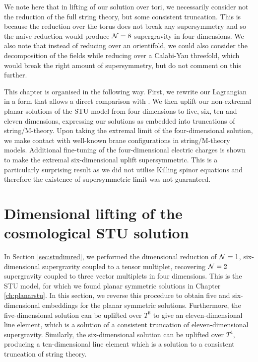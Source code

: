 We note here that in lifting of our solution over tori, we necessarily consider not the reduction of the full string theory, but some consistent truncation. This is because the reduction over the torus does not break any supersymmetry and so the naive reduction would produce ${\cal N} = 8$ supergravity in four dimensions. We also note that instead of reducing over an orientifold, we could also consider the decomposition of the fields while reducing over a Calabi-Yau threefold, which would break the right amount of supersymmetry, but do not comment on this further. 

This chapter is organised in the following way. First, we rewrite our Lagrangian  in a form that allows a direct comparison with \cite{Chow:2014cca}. We then uplift our non-extremal planar solutions of the STU model from four dimensions to five, six, ten and eleven dimensions, expressing our solutions as embedded into truncations of string/M-theory. Upon taking the extremal limit of the four-dimensional solution, we make contact with well-known brane configurations in string/M-theory models. Additional fine-tuning of the four-dimensional electric charges is shown to make the extremal six-dimensional uplift supersymmetric. This is a particularly surprising result as we did not utilise Killing spinor equations and therefore the existence of supersymmetric limit was not guaranteed.

\section{Dimensional lifting of the cosmological STU solution}
\label{sec:upliftstu}

In Section \ref{sec:studimred}, we performed the dimensional reduction of ${\cal N} = 1$, six-dimensional supergravity coupled to a tensor multiplet, recovering ${\cal N} = 2$ supergravity coupled to three vector multiplets in four dimensions. This is the STU model, for which we found planar symmetric solutions in Chapter \ref{ch:planarstu}. In this section, we reverse this procedure to obtain five and six-dimensional embeddings for the planar symmetric solutions. Furthermore, the five-dimensional solution can be uplifted over $T^6$ to give an eleven-dimensional line element, which is a solution of a consistent truncation of eleven-dimensional supergravity. Similarly, the six-dimensional solution can be uplifted over $T^4$, producing a ten-dimensional line element which is a solution to a consistent truncation of string theory.

